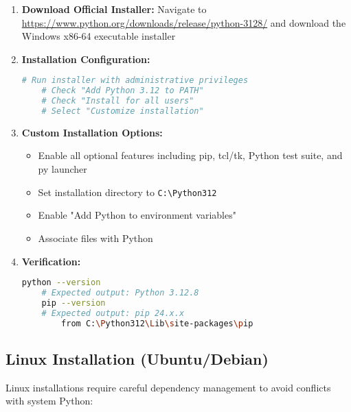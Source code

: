 \begin{enumerate}
	\item \textbf{Download Official Installer:} Navigate to \url{https://www.python.org/downloads/release/python-3128/} and download the Windows x86-64 executable installer
	\item \textbf{Installation Configuration:}
	\begin{lstlisting}[language=bash]
	# Run installer with administrative privileges
	# Check "Add Python 3.12 to PATH"
	# Check "Install for all users"
	# Select "Customize installation"
	\end{lstlisting}
	\item \textbf{Custom Installation Options:}
	\begin{itemize}
		\item Enable all optional features including pip, tcl/tk, Python test suite, and py launcher
		\item Set installation directory to \texttt{C:\textbackslash Python312}
		\item Enable "Add Python to environment variables"
		\item Associate files with Python
	\end{itemize}
	\item \textbf{Verification:}
	\begin{lstlisting}[language=bash]
	python --version
	# Expected output: Python 3.12.8
	pip --version
	# Expected output: pip 24.x.x 
		from C:\Python312\Lib\site-packages\pip
	\end{lstlisting}
\end{enumerate}

\subsection{Linux Installation (Ubuntu/Debian)}

Linux installations require careful dependency management to avoid conflicts with system Python:

